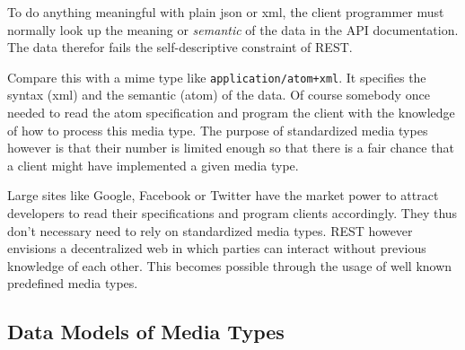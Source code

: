 \documentclass[12pt,a4paper]{scrartcl}		%
\newcommand{\citeurl}[2]{\url{#1} (#2)}
\begin{document}
To do anything meaningful with plain json or xml, the client programmer must
normally look up the meaning or \emph{semantic} of the data in the API
documentation. The data therefor fails the self-descriptive constraint of
REST.

Compare this with a mime type like \texttt{application/atom+xml}. It specifies
the syntax (xml) and the semantic (atom) of the data. Of course somebody once
needed to read the atom specification and program the client with the knowledge
of how to process this media type. The purpose of standardized media types
however is that their number is limited enough so that there is a fair chance
that a client might have implemented a given media type.

Large sites like Google, Facebook or Twitter have the market power to attract
developers to read their specifications and program clients accordingly. They
thus don't necessary need to rely on standardized media types. REST however
envisions a decentralized web in which parties can interact without previous
knowledge of each other. This becomes possible through the usage of well known
predefined media types.


\subsection{Data Models of Media Types}
\end{document}
